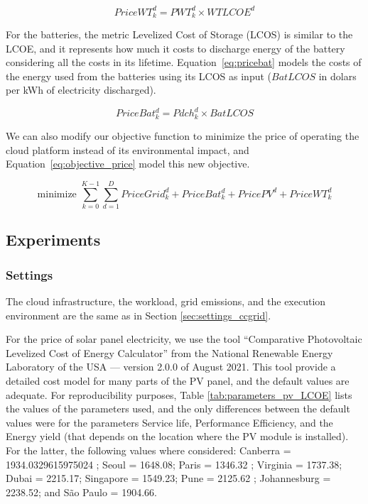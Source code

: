 \begin{equation} \label{eq:pricewt}
  PriceWT^d_k = PWT^d_k \times WTLCOE^d
\end{equation}



For the batteries, the metric Levelized Cost of Storage (LCOS) is similar to the LCOE, and it represents how much it costs to discharge energy of the battery considering all the costs in its lifetime. Equation~\eqref{eq:pricebat} models the costs of the energy used from the batteries using its LCOS as input ($BatLCOS$ in dolars per kWh of electricity discharged).

\begin{equation} \label{eq:pricebat}
   PriceBat^d_k = Pdch^d_k \times BatLCOS
\end{equation}


We can also modify our objective function to minimize the price of operating the cloud platform instead of its environmental impact, and Equation~\eqref{eq:objective_price} model this new objective.

\begin{equation} \label{eq:objective_price}
\text{minimize }\sum_{k=0}^{K-1} \sum_{d=1}^D PriceGrid^d_k  + PriceBat^d_k + PricePV^d+ PriceWT^d_k
\end{equation}


\subsection{Experiments}

\subsubsection{Settings}

The cloud infrastructure, the workload, grid emissions, and the execution environment are the same as in Section  \ref{sec:settings_ccgrid}.

For the price of solar panel electricity, we use the tool ``Comparative Photovoltaic Levelized Cost of Energy Calculator'' from the National Renewable Energy Laboratory of the USA \cite{pv_lcoe_calc} --- version 2.0.0 of August 2021. This tool provide a detailed cost model for many parts of the PV panel, and the default values are adequate. For reproducibility purposes, Table \ref{tab:parameters_pv_LCOE} lists the values of the parameters used, and the only differences between the default values were for the parameters Service life, Performance Efficiency, and the Energy yield (that depends on the location where the PV module is installed). For the latter, the following values where considered: Canberra = 1934.0329615975024 ; Seoul  = 1648.08; Paris = 1346.32 ; Virginia = 1737.38; Dubai =  2215.17; Singapore = 1549.23; Pune =  2125.62 ; Johannesburg = 2238.52; and São Paulo =  1904.66.


